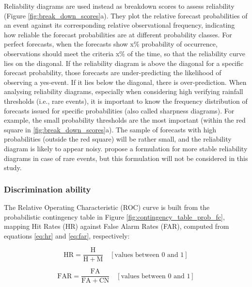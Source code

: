 Reliability  diagrams are used instead as breakdown scores to assess reliability (Figure \ref{fig:break_down_scores}a). They plot the relative forecast probabilities of an event against its corresponding relative observational frequency, indicating how reliable the forecast probabilities are at different probability classes. For perfect forecasts, when the forecasts show x\% probability of occurrence, observations should meet the criteria x\% of the time, so that the reliability curve lies on the diagonal. If the reliability diagram is above the diagonal for a specific forecast probability, those forecasts are under-predicting the likelihood of observing a yes-event. If it lies below the diagonal, there is over-prediction. When analysing reliability diagrams, especially when considering high verifying rainfall thresholds (i.e., rare events), it is important to know the frequency distribution of forecasts issued for specific probabilities (also called sharpness diagrams). For example, the small probability thresholds are the most important (within the red square in \ref{fig:break_down_scores}a). The sample of forecasts with high probabilities (outside the red square) will be rather small, and the reliability diagram is likely to appear noisy. \citet{Dimitriadis_2021} propose a formulation for more stable reliability diagrams in case of rare events, but this formulation will not be considered in this study.

\subsubsection{Discrimination ability}

The  Relative Operating Characteristic (ROC) curve is built from the probabilistic contingency table in Figure \ref{fig:contingency_table_prob_fc}, mapping Hit Rates (HR) against False Alarm Rates (FAR), computed from equations \ref{eq:hr} and \ref{eq:far}, respectively:

\begin{equation}
\mathrm{HR} = \frac{\mathrm{H}}{\mathrm{H} + \mathrm{M}}\quad[\text{values between }0\text{ and }1]
\label{eq:hr}
\end{equation}

\begin{equation}
\mathrm{FAR} = \frac{\mathrm{FA}}{\mathrm{FA} + \mathrm{CN}}\quad[\text{values between }0\text{ and }1]
\label{eq:far}
\end{equation}

